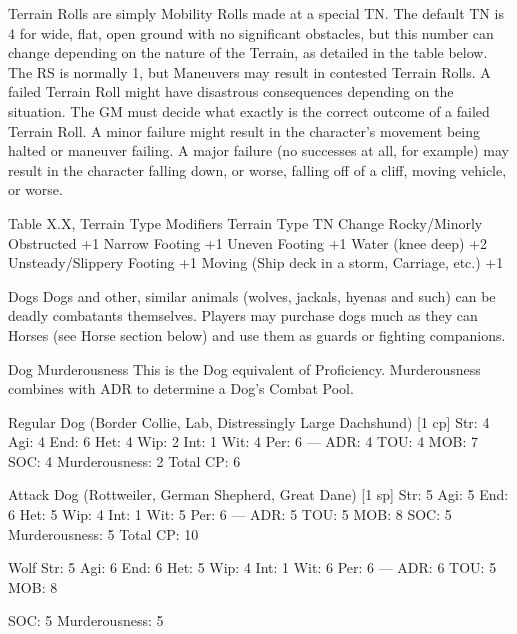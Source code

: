 \documentclass[oneside,11pt,english]{book}
\begin{document}
Terrain Rolls are simply Mobility Rolls made at a special TN. The default TN is 4 for wide, flat, open 
ground with no significant obstacles, but this number can change depending on the nature of the Terrain, 
as detailed in the table below. The RS is normally 1, but Maneuvers may result in contested Terrain Rolls. 
A failed Terrain Roll might have disastrous consequences depending on the situation. The GM must 
decide what exactly is the correct outcome of a failed Terrain Roll. A minor failure might result in the 
character’s movement being halted or maneuver failing. A major failure (no successes at all, for example) 
may result in the character falling down, or worse, falling off of a cliff, moving vehicle, or worse. 

 

Table X.X, Terrain Type Modifiers 
Terrain Type TN Change 
Rocky/Minorly Obstructed +1 
Narrow Footing +1 
Uneven Footing +1 
Water (knee deep) +2 
Unsteady/Slippery Footing +1 
Moving (Ship deck in a storm, Carriage, etc.) +1 

 

 

 

 

Dogs 
Dogs and other, similar animals (wolves, jackals, hyenas and such) can be deadly combatants themselves. 
Players may purchase dogs much as they can Horses (see Horse section below) and use them as guards or 
fighting companions. 

 


Dog Murderousness 
This is the Dog equivalent of Proficiency. Murderousness combines with ADR to determine a Dog’s 
Combat Pool. 

 

Regular Dog (Border Collie, Lab, Distressingly Large Dachshund) [1 cp] 
Str: 4 
Agi: 4 
End: 6 
Het: 4 
Wip: 2 
Int: 1 
Wit: 4 
Per: 6 
--- 
ADR: 4 
TOU: 4 
MOB: 7 
SOC: 4 
Murderousness: 2 
Total CP: 6 

 

Attack Dog (Rottweiler, German Shepherd, Great Dane) [1 sp] 
Str: 5 
Agi: 5 
End: 6 
Het: 5 
Wip: 4 
Int: 1 
Wit: 5 
Per: 6 
--- 
ADR: 5 
TOU: 5 
MOB: 8 
SOC: 5 
Murderousness: 5 
Total CP: 10 

 

Wolf 
Str: 5 
Agi: 6 
End: 6 
Het: 5 
Wip: 4 
Int: 1 
Wit: 6 
Per: 6 
--- 
ADR: 6 
TOU: 5 
MOB: 8 


SOC: 5 
Murderousness: 5 

 
\end{document}
